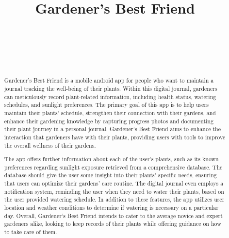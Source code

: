 \documentclass{sigchi}
\def\plaintitle{Gardener's Best Friend}
\begin{document}
\title{\plaintitle}

\author{%
  \\
 \\
  \\
  \\
}

\maketitle

\begin{abstract}
Gardener's Best Friend is a mobile android app for people who want to maintain a journal tracking the well-being of their plants. Within this digital journal, gardeners can meticulously record plant-related information, including health status, watering schedules, and sunlight preferences. The primary goal of this app is to help users maintain their plants' schedule, strengthen their connection with their gardens, and enhance their gardening knowledge by capturing progress photos and documenting their plant journey in a personal journal. Gardener's Best Friend aims to enhance the interaction that gardeners have with their plants, providing users with tools to improve the overall wellness of their gardens.

The app offers further information about each of the user's plants, such as its known preferences regarding sunlight exposure retrieved from a comprehensive database. The database should give the user some insight into their plants' specific needs, ensuring that users can optimize their gardens' care routine. The digital journal even employs a notification system, reminding the user when they need to water their plants, based on the user provided watering schedule. In addition to these features, the app utilizes user location and weather conditions to determine if watering is necessary on a particular day. Overall, Gardener's Best Friend intends to cater to the average novice and expert gardeners alike, looking to keep records of their plants while offering guidance on how to take care of them.

\end{abstract}
\end{document}
